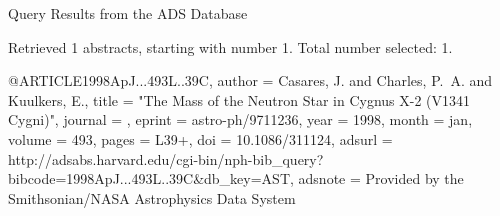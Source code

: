 Query Results from the ADS Database


Retrieved 1 abstracts, starting with number 1.  Total number selected: 1.

@ARTICLE{1998ApJ...493L..39C,
   author = {{Casares}, J. and {Charles}, P.~A. and {Kuulkers}, E.},
    title = "{The Mass of the Neutron Star in Cygnus X-2 (V1341 Cygni)}",
  journal = {\apjl},
   eprint = {astro-ph/9711236},
     year = 1998,
    month = jan,
   volume = 493,
    pages = {L39+},
      doi = {10.1086/311124},
   adsurl = {http://adsabs.harvard.edu/cgi-bin/nph-bib_query?bibcode=1998ApJ...493L..39C&db_key=AST},
  adsnote = {Provided by the Smithsonian/NASA Astrophysics Data System}
}



